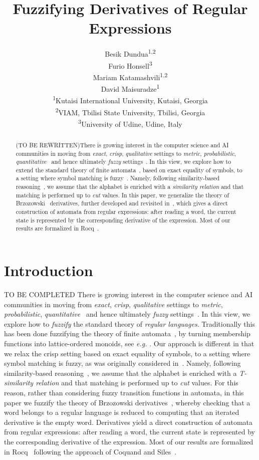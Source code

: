 \documentclass{article}
\title{Fuzzifying Derivatives of Regular Expressions}
\author{
Besik Dundua\textsuperscript{1,2}\\
Furio Honsell\textsuperscript{3}\\
Mariam Katamashvili\textsuperscript{1,2}\\
David Maisuradze\textsuperscript{1}\\[0.75em]
\small \textsuperscript{1}Kutaisi International University, Kutaisi, Georgia\\
\small \textsuperscript{2}VIAM, Tbilisi State University, Tbilisi, Georgia\\
\small \textsuperscript{3}University of Udine, Udine, Italy
}
\date{}
\def\eg{{\em e.g. }}
\begin{document}
\maketitle
\begin{abstract}{\color{red}(TO BE REWRITTEN)}There is growing interest in the computer science and AI communities in moving from {\em exact}, {\em crisp}, {\em qualitative} settings to {\em metric}, {\em probabilistic}, {\em quantitative}~\cite{AlvesKesnerRamos2025,SilvaBonchiBonsangueRutten2011} and hence ultimately {\em fuzzy} settings~\cite{met05}. In this view, we explore how to extend the standard theory of finite automata~\cite{C71}, based on exact equality of symbols, to a setting where symbol matching is fuzzy~\cite{Santos68,WeeFu69}. Namely, following similarity-based reasoning~\cite{Sessa2002},
we assume that the alphabet is enriched with a {\em similarity relation}
and that matching is performed up to {\em cut} values. In this paper, we generalize the theory of
Brzozowski~\cite{B64} derivatives, further developed and revisited
in~\cite{OwensReppyTuron}, which gives a direct construction of automata
from regular expressions: after reading a word, the current state is represented by the
corresponding derivative of the expression. Most of our results are formalized in Rocq~\cite{Rocq}.

\end{abstract}
\section{Introduction} {\color{red} TO BE COMPLETED}
There is growing interest in the computer science and AI communities in moving from {\em exact}, {\em crisp}, {\em qualitative} settings to {\em metric}, {\em probabilistic}, {\em quantitative}~\cite{AlvesKesnerRamos2025,SilvaBonchiBonsangueRutten2011} and hence ultimately {\em fuzzy} settings~\cite{met05}. In this view, we explore how to {\em fuzzify} the standard theory of {\em regular languages}. Traditionally this has been done fuzzifying the theory of finite automata~\cite{C71}, by turning membership functions into lattice-ordered monoids, see \eg\cite{LP06}. Our approach is different in that we relax the crisp setting based on exact equality of symbols, to a setting where symbol matching is fuzzy, as was originally considered in~\cite{Santos68,WeeFu69}. Namely, following similarity-based reasoning~\cite{Sessa2002},
we assume that the alphabet is enriched with a {\em T-similarity relation}
and that matching is performed up to {\em cut} values. 
For this reason, rather than considering fuzzy transition functions in automata, in this paper we fuzzify the theory of
Brzozowski derivatives~\cite{B64,OwensReppyTuron}, whereby checking that a word belongs to a regular language is reduced to computing that an iterated derivative is the empty word. Derivatives yield a direct construction of automata
from regular expressions: after reading a word, the current state is represented by the
corresponding derivative of the expression. Most of our results are formalized in Rocq~\cite{Rocq} following the approach of Coquand and Siles~\cite{CoquandRegexEquality}.
\end{document}
